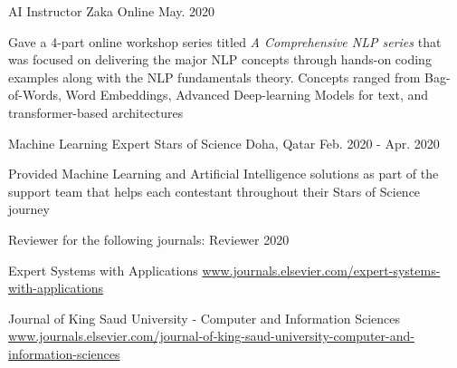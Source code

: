 

\begin{cventries}

  \cventry
    {AI Instructor} %
    {Zaka} %
    {Online} %
    {May. 2020} %
    {
      \begin{cvitems} %
        \item {Gave a 4-part online workshop series titled \textit{A Comprehensive NLP series} that was focused on delivering the major NLP concepts through hands-on coding examples along with the NLP fundamentals theory. Concepts ranged from Bag-of-Words, Word Embeddings, Advanced Deep-learning Models for text, and transformer-based architectures}
      \end{cvitems}
    }
  \cventry
    {Machine Learning Expert} %
    {Stars of Science} %
    {Doha, Qatar} %
    {Feb. 2020 - Apr. 2020} %
    {
      \begin{cvitems} %
        \item {Provided Machine Learning and Artificial Intelligence solutions as part of the support team that helps each contestant throughout their Stars of Science journey}
      \end{cvitems}
    }
\newline

  \cventry
    {Reviewer for the following journals:} %
    {Reviewer} %
    {} %
    {2020} %
    {
      \begin{cvitems} %
        \item {Expert Systems with Applications  \url{www.journals.elsevier.com/expert-systems-with-applications}}
        \item {Journal of King Saud University - Computer and Information Sciences \newline
        \url{www.journals.elsevier.com/journal-of-king-saud-university-computer-and-information-sciences}}
      \end{cvitems}
    }



\end{cventries}
